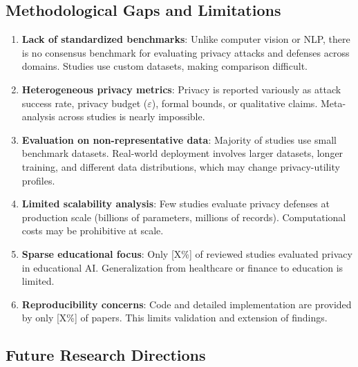 \documentclass[11pt,a4paper]{article}
\begin{document}
\subsection{Methodological Gaps and Limitations}

\begin{enumerate}
\item \textbf{Lack of standardized benchmarks}: Unlike computer vision or NLP, there is no consensus benchmark for evaluating privacy attacks and defenses across domains. Studies use custom datasets, making comparison difficult.

\item \textbf{Heterogeneous privacy metrics}: Privacy is reported variously as attack success rate, privacy budget ($\varepsilon$), formal bounds, or qualitative claims. Meta-analysis across studies is nearly impossible.

\item \textbf{Evaluation on non-representative data}: Majority of studies use small benchmark datasets. Real-world deployment involves larger datasets, longer training, and different data distributions, which may change privacy-utility profiles.

\item \textbf{Limited scalability analysis}: Few studies evaluate privacy defenses at production scale (billions of parameters, millions of records). Computational costs may be prohibitive at scale.

\item \textbf{Sparse educational focus}: Only [X\%] of reviewed studies evaluated privacy in educational AI. Generalization from healthcare or finance to education is limited.

\item \textbf{Reproducibility concerns}: Code and detailed implementation are provided by only [X\%] of papers. This limits validation and extension of findings.
\end{enumerate}

\subsection{Future Research Directions}
\end{document}

